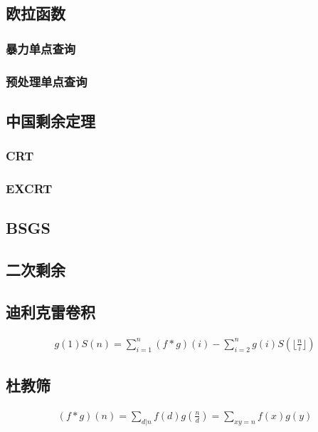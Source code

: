 \documentclass{article}
\begin{document}
\subsection{欧拉函数}
\subsubsection{暴力单点查询}

\subsubsection{预处理单点查询}

\subsection{中国剩余定理}
\subsubsection{CRT}

\subsubsection{EXCRT}

\subsection{BSGS}
\subsection{二次剩余}

\subsection{迪利克雷卷积}

$$
\begin{aligned}
g(1)S(n)=\sum_{i=1}^n(f*g)(i)-\sum_{i=2}^ng(i)S(\lfloor\frac{n}{i}\rfloor)
\end{aligned}
$$

\subsection{杜教筛}

$$
\begin{aligned}
(f*g)(n)=\underset{d|n}{\sum} f(d)g(\frac{n}{d})=\underset{xy=n}{\sum} f(x)g(y)
\end{aligned}
$$
\end{document}

